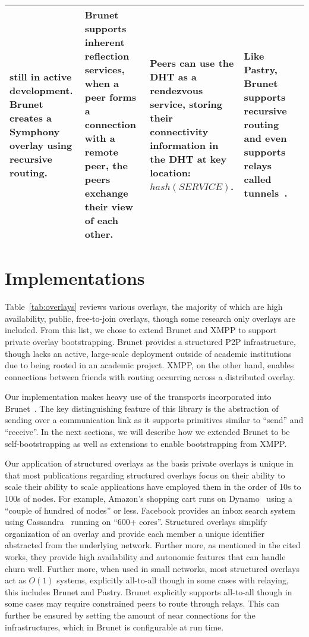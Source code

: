 \documentclass[conference]{IEEEtran}
\begin{document}
\begin{table*}[h!t!]
\begin{tabular}[c]{|m{1.5cm}||m{5.5cm}|m{3cm}|m{3cm}|m{3cm}|}
still in active development.  Brunet creates a Symphony~\cite{symphony} overlay
using recursive routing.
&
Brunet supports inherent reflection services, when a peer forms a connection
with a remote peer, the peers exchange their view of each other.
&
Peers can use the DHT as a rendezvous service, storing their connectivity
information in the DHT at key location:  $hash(SERVICE)$.
&
Like Pastry, Brunet supports recursive routing and even supports relays called
tunnels~\cite{hpdc08_0}.
\\ \hline
\end{tabular}
\caption{}
\label{tab:overlays}
\end{table*}

\section{Implementations}

Table~\ref{tab:overlays} reviews various overlays, the majority of which are
high availability, public, free-to-join overlays, though some research only
overlays are included.  From this list, we chose to extend Brunet and XMPP to
support private overlay bootstrapping.  Brunet provides a structured P2P
infrastructure, though lacks an active, large-scale deployment outside of
academic institutions due to being rooted in an academic project.  XMPP, on the
other hand, enables connections between friends with routing occurring across a
distributed overlay.

Our implementation makes heavy use of the transports incorporated into
Brunet~\cite{brunet}.  The key distinguishing feature of this library is the
abstraction of sending over a communication link as it supports primitives
similar to ``send'' and ``receive''.  In the next sections, we will describe
how we extended Brunet to be self-bootstrapping as well as extensions to enable
bootstrapping from XMPP.

Our application of structured overlays as the basis private overlays is unique
in that most publications regarding structured overlays focus on their ability
to scale their ability to scale applications have employed them in the order of
10s to 100s of nodes.  For example, Amazon's shopping cart runs on
Dynamo~\cite{dynamo} using a ``couple of hundred of nodes'' or less.  Facebook
provides an inbox search system using Cassandra~\cite{cassandra} running on
``600+ cores''.  Structured overlays simplify organization of an overlay and
provide each member a unique identifier abstracted from the underlying network.
Further more, as mentioned in the cited works, they provide high availability
and autonomic features that can handle churn well.  Further more, when used in
small networks, most structured overlays act as $O(1)$ systems, explicitly
all-to-all though in some cases with relaying, this includes Brunet and Pastry.
Brunet explicitly supports all-to-all though in some cases may require
constrained peers to route through relays.  This can further be ensured by
setting the amount of near connections for the infrastructures, which in Brunet
is configurable at run time.
\end{document}
